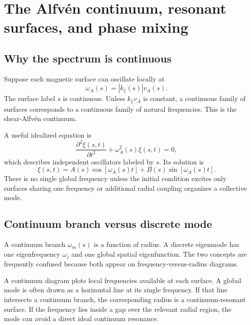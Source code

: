 \section{The Alfv\'en continuum, resonant surfaces, and phase mixing}
\label{sec:continuum}

\subsection{Why the spectrum is continuous}
Suppose each magnetic surface can oscillate locally at
\begin{equation}
\omega_A(s)=|k_\parallel(s)|v_A(s).
\end{equation}
The surface label $s$ is continuous. Unless $k_\parallel v_A$ is constant, a continuous family of surfaces corresponds to a continuous family of natural frequencies. This is the shear-Alfv\'en continuum.

A useful idealized equation is
\begin{equation}
\frac{\partial^2\xi(s,t)}{\partial t^2}+\omega_A^2(s)\xi(s,t)=0,
\label{eq:independent_surface_oscillators}
\end{equation}
which describes independent oscillators labeled by $s$. Its solution is
\begin{equation}
\xi(s,t)=A(s)\cos[\omega_A(s)t]+B(s)\sin[\omega_A(s)t].
\end{equation}
There is no single global frequency unless the initial condition excites only surfaces sharing one frequency or additional radial coupling organizes a collective mode.

\subsection{Continuum branch versus discrete mode}
A continuum branch $\omega_m(s)$ is a function of radius. A discrete eigenmode has one eigenfrequency $\omega_j$ and one global spatial eigenfunction. The two concepts are frequently confused because both appear on frequency-versus-radius diagrams.

A continuum diagram plots local frequencies available at each surface. A global mode is often drawn as a horizontal line at its single frequency. If that line intersects a continuum branch, the corresponding radius is a continuum-resonant surface. If the frequency lies inside a gap over the relevant radial region, the mode can avoid a direct ideal continuum resonance.

